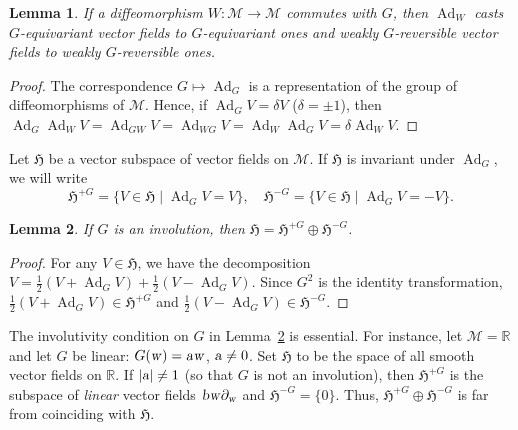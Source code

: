 \documentclass[12pt,reqno]{amsart}
\newtheorem{lem}{Lemma} \newtheorem{thm}{Theorem}
\theoremstyle{definition}
\begin{document}
\begin{lem}\label{lemB}
If a diffeomorphism $W:{\mathcal M}\to{\mathcal M}$ commutes with $G$, then $\operatorname{Ad}_W$ casts
$G$-equivariant vector fields to $G$-equivariant ones and weakly
$G$-reversible vector fields to weakly $G$-reversible ones.
\end{lem}

\begin{proof}
The correspondence $G\mapsto\operatorname{Ad}_G$ is a representation of the group of
diffeomorphisms of ${\mathcal M}$. Hence, if $\operatorname{Ad}_GV=\delta V$ ($\delta=\pm 1$), then
$\operatorname{Ad}_G\operatorname{Ad}_WV=\operatorname{Ad}_{GW}V=\operatorname{Ad}_{WG}V=\operatorname{Ad}_W\operatorname{Ad}_GV=\delta\operatorname{Ad}_WV$.
\end{proof}

Let ${\mathfrak H}$ be a vector subspace of vector fields on ${\mathcal M}$. If ${\mathfrak H}$ is
invariant under $\operatorname{Ad}_G$, we will write
\[
{\mathfrak H}^{+G}=\{V\in{\mathfrak H} \mid \operatorname{Ad}_GV=V\}, \quad {\mathfrak H}^{-G}=\{V\in{\mathfrak H} \mid \operatorname{Ad}_GV=-V\}.
\]

\begin{lem}\label{lemC}
If $G$ is an involution, then ${\mathfrak H}={\mathfrak H}^{+G}\oplus{\mathfrak H}^{-G}$.
\end{lem}

\begin{proof}
For any $V\in{\mathfrak H}$, we have the decomposition
$V=\frac{1}{2}(V+\operatorname{Ad}_GV)+\frac{1}{2}(V-\operatorname{Ad}_GV)$. Since $G^2$ is the identity
transformation, $\frac{1}{2}(V+\operatorname{Ad}_GV)\in{\mathfrak H}^{+G}$ and
$\frac{1}{2}(V-\operatorname{Ad}_GV)\in{\mathfrak H}^{-G}$.
\end{proof}

The involutivity condition on $G$ in Lemma~\ref{lemC} is essential. For
instance, let ${\mathcal M}={\mathbb R}$ and let $G$ be linear: $G({\text{\textsl{w}}})={\text{\textsl{a}}}{\text{\textsl{w}}}$,
${\text{\textsl{a}}}\neq 0$. Set ${\mathfrak H}$ to be the space of all smooth vector fields on ${\mathbb R}$.
If $|{\text{\textsl{a}}}|\neq 1$ (so that $G$ is not an involution), then ${\mathfrak H}^{+G}$ is the
subspace of \emph{linear} vector fields ${\text{\textsl{b}}}{\text{\textsl{w}}}\partial_{\text{\textsl{w}}}$ and
${\mathfrak H}^{-G}=\{0\}$. Thus, ${\mathfrak H}^{+G}\oplus{\mathfrak H}^{-G}$ is far from coinciding with
${\mathfrak H}$.
\end{document}

